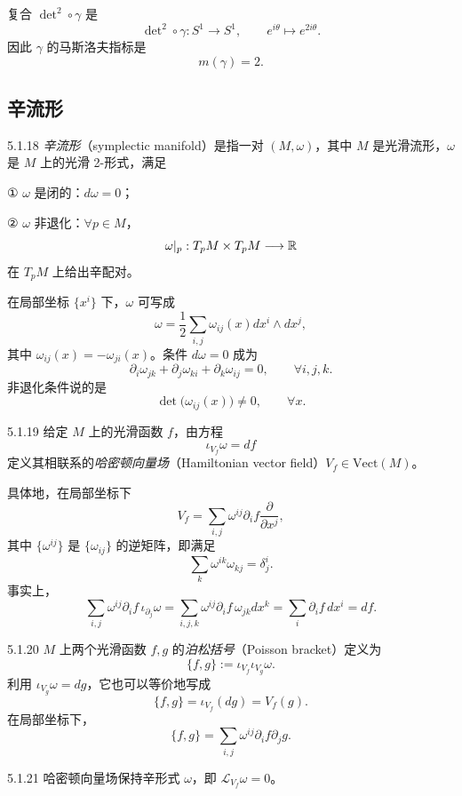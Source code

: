 复合 $\det^2\circ\gamma$ 是
\[
\det\nolimits^2\circ\gamma:S^1\longrightarrow S^1,\qquad e^{i\theta}\longmapsto e^{2i\theta}.
\]
因此 $\gamma$ 的马斯洛夫指标是
\[
m(\gamma)=2.
\]

\subsection{辛流形}

\begin{definition}{5.1.18}
\emph{辛流形}（symplectic manifold）是指一对 $(M,\omega)$，其中 $M$ 是光滑流形，$\omega$ 是 $M$ 上的光滑 2-形式，满足

① $\omega$ 是闭的：$d\omega=0$；

② $\omega$ 非退化：$\forall p\in M$，
\[
\omega|_p:T_pM\times T_pM\longrightarrow\mathbb{R}
\]
在 $T_pM$ 上给出辛配对。
\end{definition}

在局部坐标 $\{x^i\}$ 下，$\omega$ 可写成
\[
\omega=\frac12\sum_{i,j}\omega_{ij}(x)dx^i\wedge dx^j,
\]
其中 $\omega_{ij}(x)=-\omega_{ji}(x)$。条件 $d\omega=0$ 成为
\[
\partial_i\omega_{jk}+\partial_j\omega_{ki}+\partial_k\omega_{ij}=0,\qquad \forall i,j,k.
\]
非退化条件说的是
\[
\det\big(\omega_{ij}(x)\big)\neq 0,\qquad \forall x.
\]

\begin{definition}{5.1.19}
给定 $M$ 上的光滑函数 $f$，由方程
\[
\iota_{V_f}\omega=df
\]
定义其相联系的\emph{哈密顿向量场}（Hamiltonian vector field）$V_f\in\mathrm{Vect}(M)$。
\end{definition}

具体地，在局部坐标下
\[
V_f=\sum_{i,j}\omega^{ij}\partial_if\frac{\partial}{\partial x^j},
\]
其中 $\{\omega^{ij}\}$ 是 $\{\omega_{ij}\}$ 的逆矩阵，即满足
\[
\sum_k\omega^{ik}\omega_{kj}=\delta^i_j.
\]
事实上，
\[
\sum_{i,j}\omega^{ij}\partial_if\,\iota_{\partial_j}\omega
=\sum_{i,j,k}\omega^{ij}\partial_if\,\omega_{jk}dx^k
=\sum_i\partial_if\,dx^i=df.
\]


\begin{definition}{5.1.20}
$M$ 上两个光滑函数 $f,g$ 的\emph{泊松括号}（Poisson bracket）定义为
\[
\{f,g\}:=\iota_{V_f}\iota_{V_g}\omega.
\]
利用 $\iota_{V_g}\omega=dg$，它也可以等价地写成
\[
\{f,g\}=\iota_{V_f}(dg)=V_f(g).
\]
在局部坐标下，
\[
\{f,g\}=\sum_{i,j}\omega^{ij}\partial_if\partial_jg.
\]
\end{definition}

\begin{proposition}{5.1.21}
哈密顿向量场保持辛形式 $\omega$，即 $\mathcal{L}_{V_f}\omega=0$。
\end{proposition}

